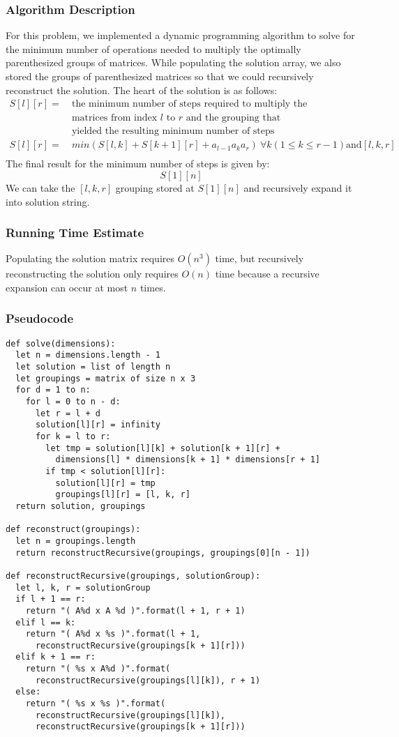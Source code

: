 \documentclass{math}
\begin{document}
\subsubsection*{Algorithm Description}
For this problem, we implemented a dynamic programming algorithm to solve for
the minimum number of operations needed to multiply the optimally parenthesized
groups of matrices. While populating the solution array, we also stored the
groups of parenthesized matrices so that we could recursively reconstruct the
solution. The heart of the solution is as follows:
\begin{align*}
  S[l][r] =~ & \text{the minimum number of steps required to multiply the} \\
  & \text{matrices from index } l \text{ to } r \text{ and the grouping that} \\
  & \text{yielded the resulting minimum number of steps}\\
  S[l][r] =~ &
    min(S[l,k] + S[k+1][r] + a_{l-1}a_ka_r)~\forall{k} (1\le k\le r-1)
    \text{and} [l, k, r] \\
\end{align*}
The final result for the minimum number of steps is given by:
\[ S[1][n] \]
We can take the \( [l,k,r] \) grouping stored at \( S[1][n] \) and recursively
expand it into solution string.

\subsubsection*{Running Time Estimate}
Populating the solution matrix requires \( O(n^3) \) time, but recursively
reconstructing the solution only requires \( O(n) \) time because a recursive
expansion can occur at most \( n \) times.

\subsubsection*{Pseudocode}
\begin{lstlisting}
def solve(dimensions):
  let n = dimensions.length - 1
  let solution = list of length n
  let groupings = matrix of size n x 3
  for d = 1 to n:
    for l = 0 to n - d:
      let r = l + d
      solution[l][r] = infinity
      for k = l to r:
        let tmp = solution[l][k] + solution[k + 1][r] +
          dimensions[l] * dimensions[k + 1] * dimensions[r + 1]
        if tmp < solution[l][r]:
          solution[l][r] = tmp
          groupings[l][r] = [l, k, r]
  return solution, groupings

def reconstruct(groupings):
  let n = groupings.length
  return reconstructRecursive(groupings, groupings[0][n - 1])

def reconstructRecursive(groupings, solutionGroup):
  let l, k, r = solutionGroup
  if l + 1 == r:
    return "( A%d x A %d )".format(l + 1, r + 1)
  elif l == k:
    return "( A%d x %s )".format(l + 1,
      reconstructRecursive(groupings[k + 1][r]))
  elif k + 1 == r:
    return "( %s x A%d )".format(
      reconstructRecursive(groupings[l][k]), r + 1)
  else:
    return "( %s x %s )".format(
      reconstructRecursive(groupings[l][k]),
      reconstructRecursive(groupings[k + 1][r]))
\end{lstlisting}
\end{document}
